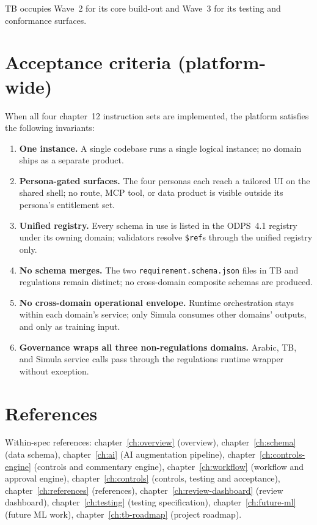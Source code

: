 \documentclass[11pt,a4paper,twoside]{report}
\begin{document}
TB occupies Wave~2 for its core build-out and Wave~3 for its testing
and conformance surfaces.

\section{Acceptance criteria (platform-wide)}
\label{sec:agent-acceptance}
When all four chapter~12 instruction sets are implemented, the
platform satisfies the following invariants:

\begin{enumerate}
\item \textbf{One instance.} A single codebase runs a single
logical instance; no domain ships as a separate product.
\item \textbf{Persona-gated surfaces.} The four personas each
reach a tailored UI on the shared shell; no route, MCP tool, or
data product is visible outside its persona's entitlement set.
\item \textbf{Unified registry.} Every schema in use is listed in
the ODPS~4.1 registry under its owning domain; validators
resolve \texttt{\$ref}s through the unified registry only.
\item \textbf{No schema merges.} The two
\texttt{requirement.schema.json} files in TB and regulations
remain distinct; no cross-domain composite schemas are produced.
\item \textbf{No cross-domain operational envelope.} Runtime
orchestration stays within each domain's service; only Simula
consumes other domains' outputs, and only as training input.
\item \textbf{Governance wraps all three non-regulations domains.}
Arabic, TB, and Simula service calls pass through the
regulations runtime wrapper without exception.
\end{enumerate}

\section{References}
\label{sec:agent-references}
Within-spec references:
chapter~\ref{ch:overview} (overview),
chapter~\ref{ch:schema} (data schema),
chapter~\ref{ch:ai} (AI augmentation pipeline),
chapter~\ref{ch:controls-engine} (controls and commentary engine),
chapter~\ref{ch:workflow} (workflow and approval engine),
chapter~\ref{ch:controls} (controls, testing and acceptance),
chapter~\ref{ch:references} (references),
chapter~\ref{ch:review-dashboard} (review dashboard),
chapter~\ref{ch:testing} (testing specification),
chapter~\ref{ch:future-ml} (future ML work),
chapter~\ref{ch:tb-roadmap} (project roadmap).
\end{document}
